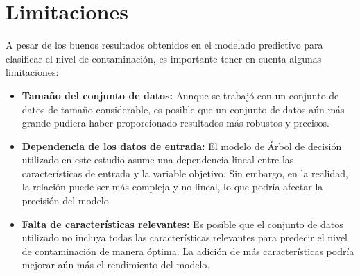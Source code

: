 \section{Limitaciones}

A pesar de los buenos resultados obtenidos en el modelado predictivo para clasificar el nivel de contaminación, es importante tener en cuenta algunas limitaciones:

\begin{itemize}
    \item \textbf{Tamaño del conjunto de datos:} Aunque se trabajó con un conjunto de datos de tamaño considerable, es posible que un conjunto de datos aún más grande pudiera haber proporcionado resultados más robustos y precisos.
    \item \textbf{Dependencia de los datos de entrada:} El modelo de Árbol de decisión utilizado en este estudio asume una dependencia lineal entre las características de entrada y la variable objetivo. Sin embargo, en la realidad, la relación puede ser más compleja y no lineal, lo que podría afectar la precisión del modelo.
    \item \textbf{Falta de características relevantes:} Es posible que el conjunto de datos utilizado no incluya todas las características relevantes para predecir el nivel de contaminación de manera óptima. La adición de más características podría mejorar aún más el rendimiento del modelo.
\end{itemize}
